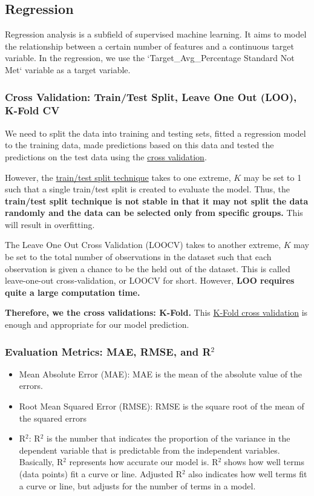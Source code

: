 \documentclass[11pt]{article}
\begin{document}
\subsection{Regression}

Regression analysis is a subfield of supervised machine learning. It aims to model the relationship between a certain number of features and a continuous target variable.
%
In the regression, we use the `Target\_Avg\_Percentage Standard Not Met` variable as a target variable. 

\subsubsection{Cross Validation: Train/Test Split, Leave One Out (LOO), K-Fold CV}

We need to split the data into training and testing sets, fitted a regression model to the training data, made predictions based on this data and tested the predictions on the test data using the \href{https://scikit-learn.org/stable/modules/cross_validation.html}{cross validation}. 

However, the \href{https://towardsdatascience.com/train-test-split-and-cross-validation-in-python-80b61beca4b6}{train/test split technique} takes to one extreme, $K$ may be set to 1 such that a single train/test split is created to evaluate the model. Thus, the \textbf{train/test split technique is not stable in that it may not split the data randomly and the data can be selected only from specific groups.} This will result in overfitting.

The Leave One Out Cross Validation (LOOCV) takes to another extreme, $K$ may be set to the total number of observations in the dataset such that each observation is given a chance to be the held out of the dataset. This is called leave-one-out cross-validation, or LOOCV for short. However, \textbf{LOO requires quite a large computation time.}

\textbf{Therefore, we the cross validations: K-Fold.} This \href{https://machinelearningmastery.com/k-fold-cross-validation/}{K-Fold cross validation} is enough and appropriate for our model prediction.

\subsubsection{Evaluation Metrics: MAE, RMSE, and R$^{2}$}

\begin{itemize}
	\item Mean Absolute Error (MAE): MAE is the mean of the absolute value of the errors. 
\item Root Mean Squared Error (RMSE): RMSE is the square root of the mean of the squared errors
\item R$^{2}$: R$^{2}$ is the number that indicates the proportion of the variance in the dependent variable that is predictable from the independent variables. Basically, R$^{2}$ represents how accurate our model is. R$^{2}$ shows how well terms (data points) fit a curve or line. Adjusted R$^{2}$ also indicates how well terms fit a curve or line, but adjusts for the number of terms in a model. 
\end{itemize}
\end{document}
